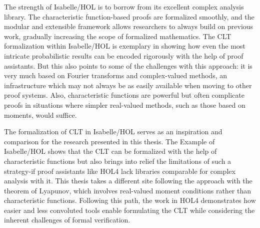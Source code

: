 The strength of Isabelle/HOL is to borrow from its excellent complex analysis library. The characteristic function-based proofs are formalized smoothly, and the modular and extensible framework allows researchers to always build on previous work, gradually increasing the scope of formalized mathematics. The CLT formalization within Isabelle/HOL is exemplary in showing how even the most intricate probabilistic results can be encoded rigorously with the help of proof assistants. But this also points to some of the challenges with this approach: it is very much based on Fourier transforms and complex-valued methods, an infrastructure which may not always be as easily available when moving to other proof systems. Also, characteristic functions are powerful but often complicate proofs in situations where simpler real-valued methods, such as those based on moments, would suffice.

The formalization of CLT in Isabelle/HOL serves as an inspiration and comparison for the research presented in this thesis. The Example of Isabelle/HOL shows that the CLT can be formalized with the help of characteristic functions but also brings into relief the limitations of such a strategy-if proof assistants like HOL4 lack libraries comparable for complex analysis with it. This thesis takes a different site following the approach with the theorem of Lyapunov, which involves real-valued moment conditions rather than characteristic functions. Following this path, the work in HOL4 demonstrates how easier and less convoluted tools enable formulating the CLT while considering the inherent challenges of formal verification.
